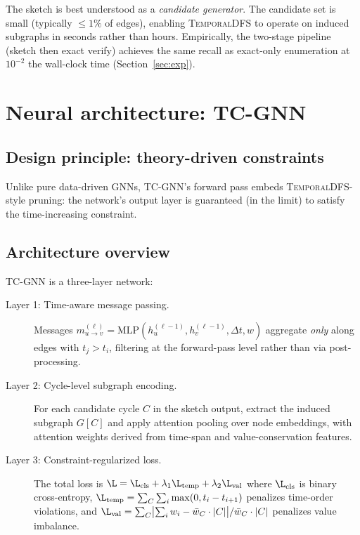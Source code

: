 \documentclass[journal,onecolumn]{IEEEtran}
\begin{document}
The sketch is best understood as a \emph{candidate generator}. The
candidate set is small (typically $\le 1\%$ of edges), enabling
\textsc{TemporalDFS} to operate on induced subgraphs in seconds rather
than hours. Empirically, the two-stage pipeline (sketch then exact
verify) achieves the same recall as exact-only enumeration at
$10^{-2}$ the wall-clock time (Section~\ref{sec:exp}).

\section{Neural architecture: \textsc{TC-GNN}}
\label{sec:model}

\subsection{Design principle: theory-driven constraints}
\label{sec:model-principle}

Unlike pure data-driven GNNs, \textsc{TC-GNN}'s forward pass embeds
\textsc{TemporalDFS}-style pruning: the network's output layer is
guaranteed (in the limit) to satisfy the time-increasing constraint.

\subsection{Architecture overview}
\label{sec:model-arch}

\textsc{TC-GNN} is a three-layer network:

\begin{description}
\item[Layer 1: Time-aware message passing.] Messages
$m_{u \to v}^{(\ell)} = \mathrm{MLP}(h_u^{(\ell-1)}, h_v^{(\ell-1)},
\Delta t, w)$ aggregate \emph{only} along edges with $t_j > t_i$,
filtering at the forward-pass level rather than via post-processing.

\item[Layer 2: Cycle-level subgraph encoding.] For each candidate cycle
$C$ in the sketch output, extract the induced subgraph $G[C]$ and apply
attention pooling over node embeddings, with attention weights derived
from time-span and value-conservation features.

\item[Layer 3: Constraint-regularized loss.] The total loss is
$\L = \L_{\mathrm{cls}} + \lambda_1 \L_{\mathrm{temp}} + \lambda_2
\L_{\mathrm{val}}$ where $\L_{\mathrm{cls}}$ is binary cross-entropy,
$\L_{\mathrm{temp}} = \sum_C \sum_i \max(0, t_i - t_{i+1})$ penalizes
time-order violations, and
$\L_{\mathrm{val}} = \sum_C \bigl|\sum_i w_i - \bar{w}_C \cdot |C|\bigr|
/ \bar{w}_C \cdot |C|$ penalizes value imbalance.
\end{description}
\end{document}

